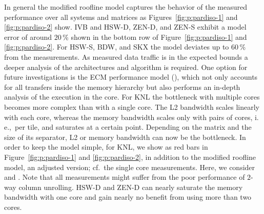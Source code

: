 In general the modified roofline model captures the behavior of the measured
performance over all systems and matrices as Figures~\ref{fig:p:pardiso-1} and \ref{fig:p:pardiso-2} show.
%
%
IVB and HSW-D, ZEN-D, and ZEN-S exhibit a model error of around $20$\,\% shown
in the bottom row of Figure~\ref{fig:p:pardiso-1} and \ref{fig:p:pardiso-2}.
For HSW-S, BDW, and SKX the model deviates up to $60$\,\% from the measurements.
%
%
As measured data traffic is in the expected bounds a deeper analysis of the
architectures and algorithm is required.
One option for future investigations is the ECM performance
model (\cite{hager-2012-ecm}), which not only accounts for all transfers inside
the memory hierarchy but also performs an in-depth analysis of the execution in
the core.
%
%
For KNL the bottleneck with multiple cores becomes more complex than with a
single core.
The L2 bandwidth scales linearly with each core, whereas the memory bandwidth
scales only with pairs of cores, i.\,e.,\ per tile, and saturates at a certain
point.
Depending on the matrix and the size of its separator, L2 or memory bandwidth can
now be the bottleneck.
%
In order to keep the model simple, for KNL, we show
as red bars in Figure~\ref{fig:p:pardiso-1} and \ref{fig:p:pardiso-2},
in addition
to the modified
roofline model, 
an adjusted version; cf.\ the single core measurements.
Here, we consider  and .
Note that all measurements might suffer from the poor performance of $2$-way
column unrolling.
%
% 
HSW-D and ZEN-D can nearly saturate the memory bandwidth with one core and gain
nearly no benefit from using more than two cores.

